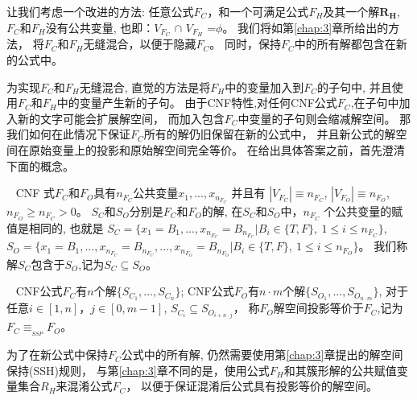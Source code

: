 让我们考虑一个改进的方法:
任意公式$F_C$，和一个可满足公式$F_H$及其一个解\textsl{${\textbf{R}}_{\textbf{H}}$},
$F_C$和$F_H$没有公共变量, 也即：$V_{F_C}$ $\cap$ $V_{F_H}$ =$\phi$。
我们将如第\ref{chap:3}章所给出的方法，
将$F_C$和$F_H$无缝混合，以便于隐藏$F_C$。
同时，保持$F_C$中的所有解都包含在新的公式中。

为实现$F_C$和$F_H$无缝混合,
直觉的方法是将$F_H$中的变量加入到$F_C$的子句中,
并且使用$F_C$和$F_H$中的变量产生新的子句。
由于CNF特性,对任何CNF公式$F_C$,在子句中加入新的文字可能会扩展解空间，
而加入包含$F_C$中变量的子句则会缩减解空间。
那我们如何在此情况下保证$F_C$所有的解仍旧保留在新的公式中，
并且新公式的解空间在原始变量上的投影和原始解空间完全等价。
在给出具体答案之前，首先澄清下面的概念。

\begin{definition}~
CNF 式$F_C$和$F_O$具有$n_{F_C}$公共变量$x_1,...,x_{n_{F_C}}$ 并且有
$|V_{F_C}|\equiv n_{F_C}$, $|V_{F_O}|\equiv n_{F_O}$, $ n_{F_O}\geqslant n_{F_C} > 0$。
$S_C$和$S_O$分别是$F_C$和$F_O$的解,
在$S_C$和$S_O$中，$n_{F_C}$ 个公共变量的赋值是相同的, 也就是
$S_C=\{x_1=B_1,...,x_{n_{F_C}}=B_{n_{F_C}} | B_i \in \{T,F\},~1\leqslant i\leqslant n_{F_C} \}$,
$S_O=\{x_1=B_1,...,x_{n_{F_C}}=B_{n_{F_C}},...,x_{n_{F_O}}=B_{n_{F_O}}|B_i\in \{T,F\},~ 1\leqslant i\leqslant n_{F_O} \}$。
我们称解$S_C$包含于$S_O$,记为$S_C\subseteq S_O$。
\end{definition}


\begin{definition}\label{4:SSPdefinition}~
CNF公式$F_C$有$n$个解$\{S_{C_1},...,S_{C_n}\}$;
CNF公式$F_O$有$n \cdot m$个解$\{S_{O_1},...,S_{O_{n \cdot m}}\}$,
对于任意$i \in [1,n]，j \in [0,m-1]$, $S_{C_i} \subseteq S_{O_{i + {n \cdot j}}}$，
称$F_O$解空间投影等价于$F_C$,记为$F_C \equiv_{_{SSP}} F_O$。
\end{definition}

为了在新公式中保持$F_C$公式中的所有解,
仍然需要使用第\ref{chap:3}章提出的解空间保持(SSH)规则，
与第\ref{chap:3}章不同的是，使用公式$F_H$和其簇形解的公共赋值变量集合$R_H$来混淆公式$F_C$，
以便于保证混淆后公式具有投影等价的解空间。


